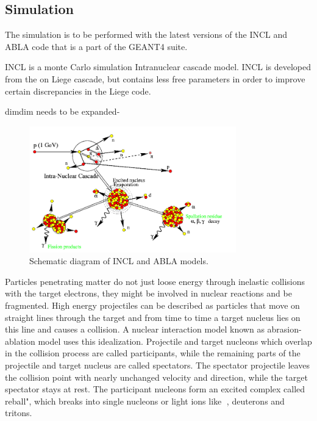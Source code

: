 \subsection{Simulation}

The simulation is to be performed with the latest versions of the INCL and ABLA code that is a part of the GEANT4 suite.

INCL is a monte Carlo simulation Intranuclear cascade model. INCL is developed from the on Liege cascade, but contains less free parameters in order to improve certain discrepancies in the Liege code.

dimdim needs to be expanded-


\begin{figure} 
\begin{center}
\includegraphics[width=0.8\textwidth]{images/inclScematic.png}  
\caption{\label{fig:inclschematic} Schematic diagram of INCL and ABLA models.}
 
 \end{center}
 \end{figure}
Particles penetrating matter do not just loose energy through inelastic collisions with the
target electrons, they might be involved in nuclear reactions and be fragmented. High
energy projectiles can be described as particles that move on straight lines through the
target and from time to time a target nucleus lies on this line and causes a collision. A
nuclear interaction model known as abrasion-ablation model uses this idealization. Projectile
and target nucleons which overlap in the collision process are called participants,
while the remaining parts of the projectile and target nucleus are called spectators. The
spectator projectile leaves the collision point with nearly unchanged velocity and direction,
while the target spectator stays at rest. The participant nucleons form an excited
complex called \reball", which breaks into single nucleons or light ions like , deuterons
and tritons.


